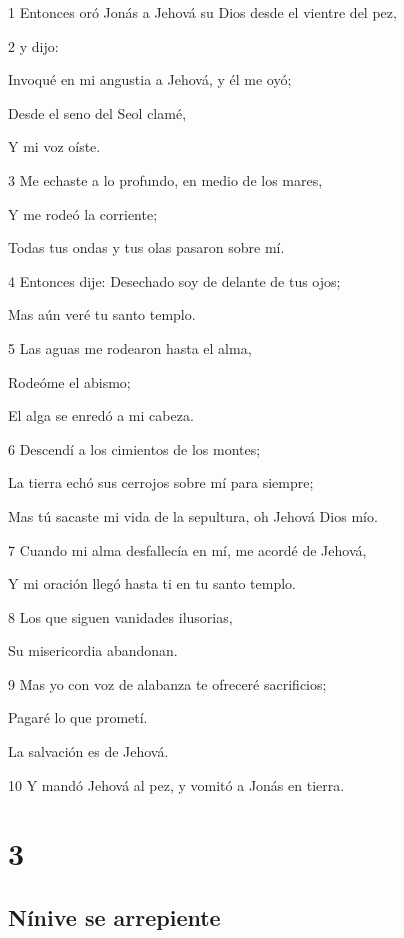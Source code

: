 \par 1 Entonces oró Jonás a Jehová su Dios desde el vientre del pez,
\par 2 y dijo:
\par Invoqué en mi angustia a Jehová, y él me oyó;
\par Desde el seno del Seol clamé,
\par Y mi voz oíste.
\par 3 Me echaste a lo profundo, en medio de los mares,
\par Y me rodeó la corriente;
\par Todas tus ondas y tus olas pasaron sobre mí.
\par 4 Entonces dije: Desechado soy de delante de tus ojos;
\par Mas aún veré tu santo templo.
\par 5 Las aguas me rodearon hasta el alma,
\par Rodeóme el abismo;
\par El alga se enredó a mi cabeza.
\par 6 Descendí a los cimientos de los montes;
\par La tierra echó sus cerrojos sobre mí para siempre;
\par Mas tú sacaste mi vida de la sepultura, oh Jehová Dios mío.
\par 7 Cuando mi alma desfallecía en mí, me acordé de Jehová,
\par Y mi oración llegó hasta ti en tu santo templo.
\par 8 Los que siguen vanidades ilusorias,
\par Su misericordia abandonan.
\par 9 Mas yo con voz de alabanza te ofreceré sacrificios;
\par Pagaré lo que prometí.
\par La salvación es de Jehová.
\par 10 Y mandó Jehová al pez, y vomitó a Jonás en tierra.

\chapter{3}

\section*{Nínive se arrepiente}

